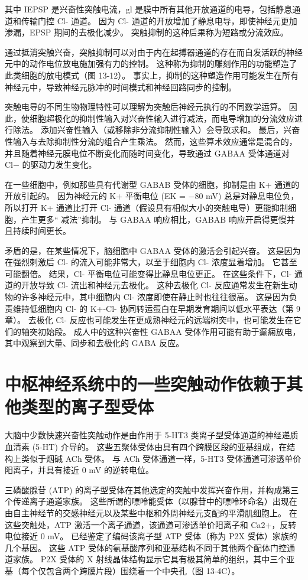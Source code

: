 其中 IEPSP 是兴奋性突触电流，gl 是膜中所有其他开放通道的电导，包括静息通道和传输门控 Cl- 通道。 因为 Cl- 通道的开放增加了静息电导，即使神经元更加渗漏，EPSP 期间的去极化减少。 突触抑制的这种后果称为短路或分流效应。

通过抵消突触兴奋，突触抑制可以对由于内在起搏器通道的存在而自发活跃的神经元中的动作电位放电施加强有力的控制。 这种称为抑制的雕刻作用的功能塑造了此类细胞的放电模式（图 13-12）。 事实上，抑制的这种塑造作用可能发生在所有神经元中，导致神经元脉冲的时间模式和神经回路同步的控制。

突触电导的不同生物物理特性可以理解为突触后神经元执行的不同数学运算。 因此，使细胞超极化的抑制性输入对兴奋性输入进行减法，而电导增加的分流效应进行除法。 添加兴奋性输入（或移除非分流抑制性输入）会导致求和。 最后，兴奋性输入与去除抑制性分流的组合产生乘法。 然而，这些算术效应通常是混合的，并且随着神经元膜电位不断变化而随时间变化，导致通过 GABAA 受体通道对 Cl− 的驱动力发生变化。

在一些细胞中，例如那些具有代谢型 GABAB 受体的细胞，抑制是由 K+ 通道的开放引起的。 因为神经元的 K+ 平衡电位 (EK = −80 mV) 总是对静息电位负，所以打开 K+ 通道比打开 Cl- 通道（假设具有相似大小的突触电导）更能抑制细胞，产生更多“ 减法”抑制。 与 GABAA 响应相比，GABAB 响应开启得更慢并且持续时间更长。

矛盾的是，在某些情况下，脑细胞中 GABAA 受体的激活会引起兴奋。 这是因为在强烈刺激后 Cl- 的流入可能非常大，以至于细胞内 Cl- 浓度显着增加。 它甚至可能翻倍。 结果，Cl- 平衡电位可能变得比静息电位更正。 在这些条件下，Cl- 通道的开放导致 Cl- 流出和神经元去极化。 这种去极化 Cl- 反应通常发生在新生动物的许多神经元中，其中细胞内 Cl- 浓度即使在静止时也往往很高。 这是因为负责维持低细胞内 Cl- 的 K+-Cl- 协同转运蛋白在早期发育期间以低水平表达（第 9 章）。 去极化 Cl- 反应也可能发生在更成熟神经元的远端树突中，也可能发生在它们的轴突初始段。 成人中的这种兴奋性 GABAA 受体作用可能有助于癫痫放电，其中观察到大量、同步和去极化的 GABA 反应。


\section{中枢神经系统中的一些突触动作依赖于其他类型的离子型受体}
大脑中少数快速兴奋性突触动作是由作用于 5-HT3 类离子型受体通道的神经递质血清素 (5-HT) 介导的。 这些五聚体受体由具有四个跨膜区段的亚基组成，在结构上类似于烟碱 ACh 受体。 与 ACh 受体通道一样，5-HT3 受体通道可渗透单价阳离子，并具有接近 0 mV 的逆转电位。

三磷酸腺苷 (ATP) 的离子型受体在其他选定的突触中发挥兴奋作用，并构成第三个传递离子通道家族。 这些所谓的嘌呤能受体（以腺苷中的嘌呤环命名）出现在由自主神经节的交感神经元以及某些中枢和外周神经元支配的平滑肌细胞上。 在这些突触处，ATP 激活一个离子通道，该通道可渗透单价阳离子和 Ca2+，反转电位接近 0 mV。 已经鉴定了编码该离子型 ATP 受体（称为 P2X 受体）家族的几个基因。 这些 ATP 受体的氨基酸序列和亚基结构不同于其他两个配体门控通道家族。 P2X 受体的 X 射线晶体结构显示它具有极其简单的组织，其中三个亚基（每个仅包含两个跨膜片段）围绕着一个中央孔（图 13-4C）。


